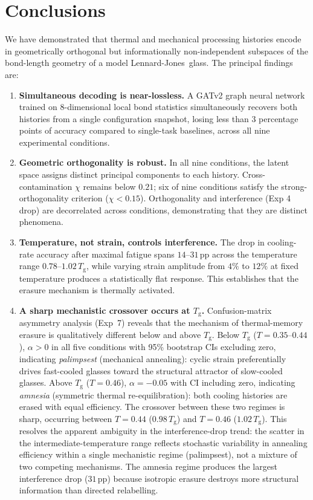 \documentclass[12pt,a4paper]{article}
\newcommand{\Tg}{T_{\mathrm{g}}}
\newcommand{\degpp}{\,\text{pp}}
\newcommand{\xcontam}{\chi}
\newcommand{\LJ}{Lennard-Jones}
\begin{document}
\section{Conclusions}
\label{sec:conclusions}

We have demonstrated that thermal and mechanical processing histories encode in geometrically orthogonal but informationally non-independent subspaces of the bond-length geometry of a model \LJ\ glass.
The principal findings are:

\begin{enumerate}
  \item \textbf{Simultaneous decoding is near-lossless.} A GATv2 graph neural network trained on 8-dimensional local bond statistics simultaneously recovers both histories from a single configuration snapshot, losing less than $3$ percentage points of accuracy compared to single-task baselines, across all nine experimental conditions.

  \item \textbf{Geometric orthogonality is robust.} In all nine conditions, the latent space assigns distinct principal components to each history. Cross-contamination $\xcontam$ remains below $0.21$; six of nine conditions satisfy the strong-orthogonality criterion ($\xcontam < 0.15$). Orthogonality and interference (Exp 4 drop) are decorrelated across conditions, demonstrating that they are distinct phenomena.

  \item \textbf{Temperature, not strain, controls interference.} The drop in cooling-rate accuracy after maximal fatigue spans $14$--$31\degpp$ across the temperature range $0.78$--$1.02\,\Tg$, while varying strain amplitude from $4\%$ to $12\%$ at fixed temperature produces a statistically flat response. This establishes that the erasure mechanism is thermally activated.


  \item \textbf{A sharp mechanistic crossover occurs at $\Tg$.}
  Confusion-matrix asymmetry analysis (Exp~7) reveals that the mechanism of thermal-memory erasure is qualitatively different below and above $\Tg$.
  Below $\Tg$ ($T = 0.35$--$0.44$), $\alpha > 0$ in all five conditions with 95\% bootstrap CIs excluding zero, indicating \emph{palimpsest} (mechanical annealing): cyclic strain preferentially drives fast-cooled glasses toward the structural attractor of slow-cooled glasses.
  Above $\Tg$ ($T = 0.46$), $\alpha = -0.05$ with CI including zero, indicating \emph{amnesia} (symmetric thermal re-equilibration): both cooling histories are erased with equal efficiency.
  The crossover between these two regimes is sharp, occurring between $T = 0.44$ ($0.98\,\Tg$) and $T = 0.46$ ($1.02\,\Tg$).
  This resolves the apparent ambiguity in the interference-drop trend: the scatter in the intermediate-temperature range reflects stochastic variability in annealing efficiency within a single mechanistic regime (palimpsest), not a mixture of two competing mechanisms.
  The amnesia regime produces the largest interference drop ($31\degpp$) because isotropic erasure destroys more structural information than directed relabelling.


\end{enumerate}
\end{document}
